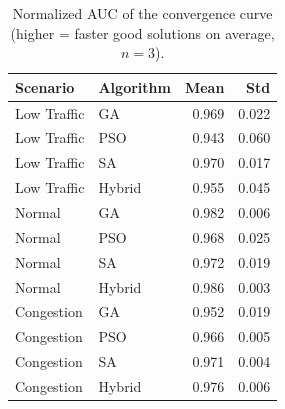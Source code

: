 \begin{table}[H]
\centering
\caption{Normalized AUC of the convergence curve (higher = faster good solutions on average, $n=3$).}
\label{tab:auc}
\begin{tabular}{llrr}
\toprule
\textbf{Scenario} & \textbf{Algorithm} & \textbf{Mean} & \textbf{Std} \\
\midrule
Low Traffic  & GA     & 0.969 & 0.022 \\
Low Traffic  & PSO    & 0.943 & 0.060 \\
Low Traffic  & SA     & 0.970 & 0.017 \\
Low Traffic  & Hybrid & 0.955 & 0.045 \\
\midrule
Normal       & GA     & 0.982 & 0.006 \\
Normal       & PSO    & 0.968 & 0.025 \\
Normal       & SA     & 0.972 & 0.019 \\
Normal       & Hybrid & 0.986 & 0.003 \\
\midrule
Congestion   & GA     & 0.952 & 0.019 \\
Congestion   & PSO    & 0.966 & 0.005 \\
Congestion   & SA     & 0.971 & 0.004 \\
Congestion   & Hybrid & 0.976 & 0.006 \\
\bottomrule
\end{tabular}
\end{table}


